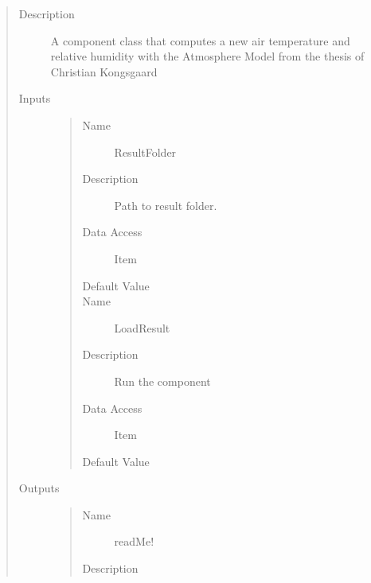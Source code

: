 \documentclass[letterpaper,10pt,english]{sphinxmanual}
\begin{document}
\begin{quote}\begin{description}
\item[{Description}] \leavevmode
A component class that computes a new air temperature and relative humidity with the Atmosphere Model from the thesis of Christian Kongsgaard

\item[{Inputs}] \leavevmode\begin{quote}\begin{description}
\item[{Name}] \leavevmode
ResultFolder

\item[{Description}] \leavevmode
Path to result folder.

\item[{Data Access}] \leavevmode
Item

\item[{Default Value}] \leavevmode
{}

\item[{Name}] \leavevmode
LoadResult

\item[{Description}] \leavevmode
Run the component

\item[{Data Access}] \leavevmode
Item

\item[{Default Value}] \leavevmode
{}

\end{description}\end{quote}

\item[{Outputs}] \leavevmode\begin{quote}\begin{description}
\item[{Name}] \leavevmode
readMe!

\item[{Description}] \leavevmode
{}


\end{description}
\end{quote}
\end{description}
\end{quote}
\end{document}
